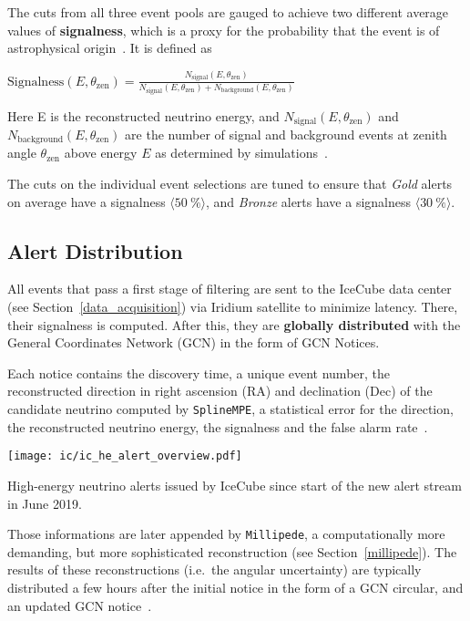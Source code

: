 The cuts from all three event pools are gauged to achieve two different average values of \textbf{signalness}, which is a proxy for the probability that the event is of astrophysical origin~\cite{Abbasi2023}. It is defined as
\begin{definition}\label{signalness_def}
    $\text{Signalness}(E,\theta_\text{zen}) = \frac{N_\text{signal}(E,\theta_\text{zen})}{N_\text{signal}(E,\theta_\text{zen})+N_\text{background}(E,\theta_\text{zen})}$
\end{definition}
Here E is the reconstructed neutrino energy, and $N_\text{signal}(E,\theta_\text{zen})$ and $N_\text{background}(E,\theta_\text{zen})$ are the number of signal and background events at zenith angle $\theta_\text{zen}$ above energy $E$ as determined by simulations~\cite{Abbasi2023}.

The cuts on the individual event selections are tuned to ensure that \textit{Gold} alerts on average have a signalness $\langle \SI{50}{\percent} \rangle$, and \textit{Bronze} alerts have a signalness $\langle \SI{30}{\percent} \rangle$.

\subsection{Alert Distribution} \label{ic_alerts}
All events that pass a first stage of filtering are sent to the IceCube data center (see Section~\ref{data_acquisition}) via Iridium satellite to minimize latency. There, their signalness is computed. After this, they are \textbf{globally distributed} with the General Coordinates Network (GCN) in the form of GCN Notices.

Each notice contains the discovery time, a unique event number, the reconstructed direction in right ascension (RA) and declination (Dec) of the candidate neutrino computed by \texttt{SplineMPE}, a statistical error for the direction, the reconstructed neutrino energy, the signalness and the false alarm rate~\cite{Blaufuss2019}.

\begin{marginfigure}
    \texttt{[image: ic/ic\_he\_alert\_overview.pdf]}
    \caption[IceCube alert overview]{High-energy neutrino alerts issued by IceCube since start of the new alert stream in June 2019.}
\end{marginfigure}

Those informations are later appended by \texttt{Millipede}, a computationally more demanding, but more sophisticated reconstruction (see Section~\ref{millipede}). The results of these reconstructions (i.e.\ the angular uncertainty) are typically distributed a few hours after the initial notice in the form of a GCN circular, and an updated GCN notice~\cite{Blaufuss2019}.

